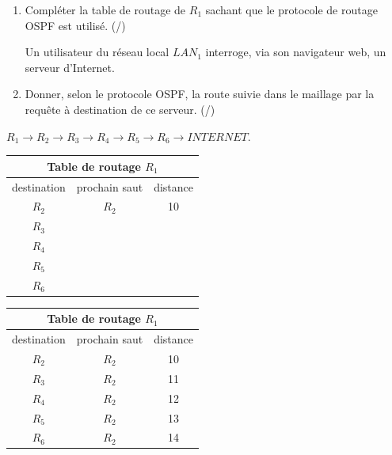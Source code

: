 \begin{minipage}[h]{0.50\linewidth}
\begin{enumerate}[resume=monDS]
        \item Compléter la table de routage de $R_1$ sachant que le protocole de routage OSPF est utilisé. (/)

Un utilisateur du réseau local $LAN_1$ interroge, via son navigateur web, un serveur d'Internet.

\item Donner, selon le protocole OSPF, la route suivie dans le maillage par la requête à destination de ce serveur. (/)
    \end{enumerate}
    
\begin{blocvisiblex}[height=1]   
    {}
    $R_1 \rightarrow R_2 \rightarrow R_3 \rightarrow R_4 \rightarrow R_5 \rightarrow R_6 \rightarrow INTERNET$.
    \end{blocvisiblex}
\end{minipage}
\begin{minipage}[h]{0.45\linewidth}
    \begin{blocvisiblex}[height=5]
{    \centering
    \renewcommand{\arraystretch}{1.3} %
    \begin{tabular}{|c|c|c|}
        \hline
        \multicolumn{3}{|c|}{\textbf{Table de routage $R_1$}} \\ \hline
        destination & prochain saut & distance \\ \hline
        $R_2$       & $R_2$         & 10        \\ \hline
        $R_3$       &               &          \\ \hline
        $R_4$       &               &          \\ \hline
        $R_5$       &               &          \\ \hline
        $R_6$       &               &          \\ \hline
    \end{tabular}}
\centering
    \renewcommand{\arraystretch}{1.3} %
    \begin{tabular}{|c|c|c|}
        \hline
        \multicolumn{3}{|c|}{\textbf{Table de routage $R_1$}} \\ \hline
        destination & prochain saut & distance \\ \hline
        $R_2$       & $R_2$         & 10        \\ \hline
        $R_3$       & $R_2$              &  11        \\ \hline
        $R_4$       & $R_2$              &  12        \\ \hline
        $R_5$       & $R_2$              &  13        \\ \hline
        $R_6$       & $R_2$              &  14        \\ \hline
        
    \end{tabular}
\end{blocvisiblex}
\end{minipage}
